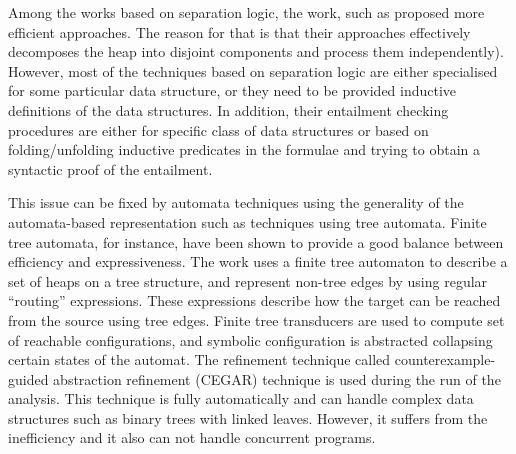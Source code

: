 %
%  
Among the works based on separation logic, the work, such as \cite{JoshCris:SL,Hongseok:SL, Quang:SL} proposed more efficient approaches. The reason for that is that their approaches effectively decomposes the heap into disjoint components and process them independently). However, most of the techniques based on separation logic are either specialised for some particular data structure, or they need to be provided inductive definitions of the data structures. In addition, their entailment checking procedures are either for specific class of data structures or based on folding/unfolding inductive predicates in the formulae and trying to obtain a syntactic proof of the entailment. 

This issue can be fixed by automata techniques using the generality of the automata-based representation such as techniques using tree automata. Finite tree automata, for instance, have been shown to provide a good balance between efficiency and expressiveness. The work \cite{Ahmed:TreeAutomata} uses a finite tree automaton to describe a set of heaps on a tree structure,
and represent non-tree edges by using regular “routing” expressions. These expressions
describe how the target can be reached from the source using tree edges. Finite tree transducers
are used to compute set of reachable configurations, and symbolic configuration is abstracted
collapsing certain states of the automat. The refinement technique called counterexample-guided
abstraction refinement (CEGAR) technique is used during the run of the analysis. This technique
is fully automatically and can handle complex data structures such as binary trees with linked
leaves. However, it suffers from the inefficiency and it also can not handle concurrent programs.

